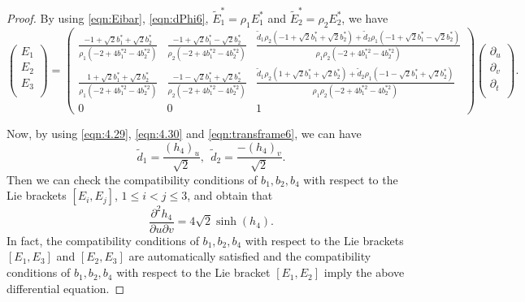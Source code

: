 \documentclass[reqno]{amsart}%
\theoremstyle{definition}
\numberwithin{equation}{section}
\begin{document}
\begin{proof}
By using \eqref{eqn:Eibar}, \eqref{eqn:dPhi6}, $\tilde{E}_1^*=\rho_1E_1^*$
and $\tilde{E}_2^*=\rho_2E_2^*$, we have
\begin{equation}\label{eqn:transframe6}
\left(
  \begin{array}{c}
    E_1 \\
    E_2 \\
    E_3 \\
  \end{array}
\right)
=\left(\begin{array}{cccc}
\frac{-1+\sqrt{2}b_1^*+\sqrt{2}b_2^*}{\rho_1(-2+4b_1^{*2}-4b_2^{*2})} & \frac{-1+\sqrt{2}b_1^*-\sqrt{2}b_2^*}{\rho_2(-2+4b_1^{*2}-4b_2^{*2})} & %
\frac{\tilde{d}_1\rho_2(-1+\sqrt{2}b_1^*+\sqrt{2}b_2^*)+\tilde{d}_2\rho_1(-1+\sqrt{2}b_1^*-\sqrt{2}b_2^*)}
{\rho_1\rho_2(-2+4b_1^{*2}-4b_2^{*2})}\\
\frac{1+\sqrt{2}b_1^*+\sqrt{2}b_2^*}{\rho_1(-2+4b_1^{*2}-4b_2^{*2})} & \frac{-1-\sqrt{2}b_1^*+\sqrt{2}b_2^*}{\rho_2(-2+4b_1^{*2}-4b_2^{*2})} & %
\frac{\tilde{d}_1\rho_2(1+\sqrt{2}b_1^*+\sqrt{2}b_2^*)+\tilde{d}_2\rho_1(-1-\sqrt{2}b_1^*+\sqrt{2}b_2^*)}
{\rho_1\rho_2(-2+4b_1^{*2}-4b_2^{*2})}
\\
0 & 0 & 1
\end{array}\right)
\left(
  \begin{array}{c}
    \partial_u \\
    \partial_v \\
    \partial_t \\
  \end{array}
\right).
\end{equation}

Now, by using \eqref{eqn:4.29}, \eqref{eqn:4.30} and \eqref{eqn:transframe6}, we can have
$$
\tilde{d}_1=\frac{(h_4)_u}{\sqrt{2}},\ \ \tilde{d}_2=\frac{-(h_4)_v}{\sqrt{2}}.
$$
Then we can check the compatibility conditions of $b_1,b_2,b_4$ with respect to the Lie brackets $[E_i,E_j]$, $1\leq i<j\leq3$,
and obtain that
$$
\frac{\partial^2 h_4}{\partial u \partial v}
=4\sqrt{2}\sinh(h_4).
$$
In fact, the  compatibility conditions of  $b_1,b_2,b_4$  with respect to the Lie brackets $[E_1,E_3]$ and $[E_2,E_3]$ are automatically satisfied and the  compatibility conditions of  $b_1,b_2,b_4$  with respect to the Lie bracket $[E_1,E_2]$  imply the above differential equation.


\end{proof}
\end{document}
